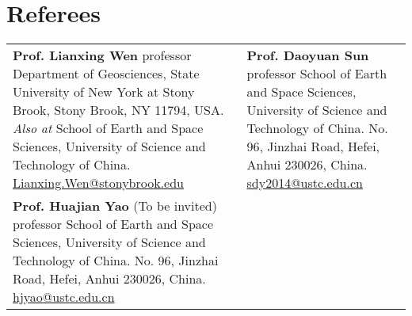 \section*{Referees}
\renewcommand{\arraystretch}{2.0}

\begin{tabular}{p{} p{}}
\textbf{Prof. Lianxing Wen} \newline
professor \newline
Department of Geosciences, \newline
State University of New York at Stony Brook, \newline
Stony Brook, NY 11794, USA. \newline
\textit{Also at} School of Earth and Space Sciences, \newline
University of Science and Technology of China. \newline
\href{mailto:Lianxing.Wen@stonybrook.edu}{Lianxing.Wen@stonybrook.edu}
&
\textbf{Prof. Daoyuan Sun} \newline
professor \newline
School of Earth and Space Sciences, \newline
University of Science and Technology of China. \newline
No. 96, Jinzhai Road, Hefei, Anhui 230026, China. \newline
\href{mailto:sdy2014@ustc.edu.cn}{sdy2014@ustc.edu.cn}
\\

\textbf{Prof. Huajian Yao} (To be invited)\newline
professor \newline
School of Earth and Space Sciences, \newline
University of Science and Technology of China. \newline
No. 96, Jinzhai Road, Hefei, Anhui 230026, China. \newline
\href{mailto:hjyao@ustc.edu.cn}{hjyao@ustc.edu.cn}
&
~
\\
\end{tabular}
